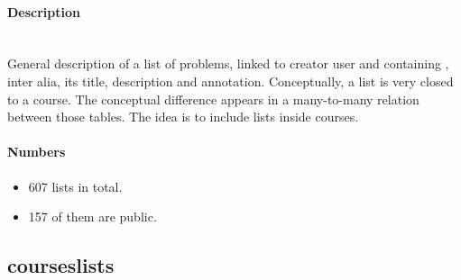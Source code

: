 \documentclass[../main.tex]{subfiles}
\begin{document}
\begin{figure}
  \vspace{-20pt}
  \begin{center}
  \end{center}
  \vspace{-20pt}
\end{figure}

\paragraph{Description}~\\ %
General description of a list of problems, linked to creator user and containing , inter alia, its title, description and annotation.
Conceptually, a list is very closed to a course. The conceptual difference appears in a many-to-many relation between those tables. The idea is to include lists inside courses.

\paragraph{Numbers} %
\begin{itemize}
	\setlength\itemsep{0em}
	\item 607 lists in total.
	\item 157 of them are public.
\end{itemize}



\subsection{courseslists} %
\begin{figure}
  \vspace{-20pt}
  \begin{center}
  \end{center}
  \vspace{-20pt}
\end{figure}
\end{document}
